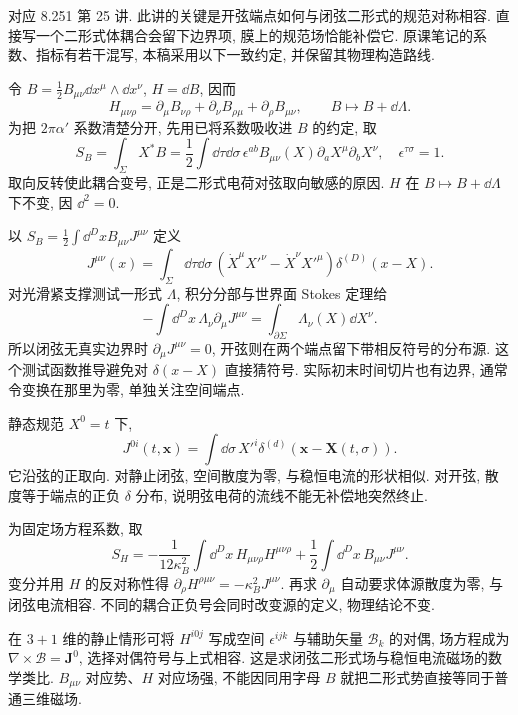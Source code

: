 \label{ch:basic-twoform}
对应 8.251 第 25 讲. 此讲的关键是开弦端点如何与闭弦二形式的规范对称相容. 直接写一个二形式体耦合会留下边界项, 膜上的规范场恰能补偿它. 原课笔记的系数、指标有若干混写, 本稿采用以下一致约定, 并保留其物理构造路线.

令 $B=\frac12B_{\mu\nu}\dd x^\mu\wedge\dd x^\nu$, $H=\dd B$, 因而
\[
 H_{\mu\nu\rho}=\partial_\mu B_{\nu\rho}
 +\partial_\nu B_{\rho\mu}+\partial_\rho B_{\mu\nu},
 \qquad B\mapsto B+\dd\Lambda.
\]
为把 $2\pi\alpha'$ 系数清楚分开, 先用已将系数吸收进 $B$ 的约定, 取
\[
 S_B=\int_\Sigma X^*B
 =\frac12\int\dd\tau\dd\sigma\,
 \epsilon^{ab}B_{\mu\nu}(X)\partial_aX^\mu\partial_bX^\nu,
 \quad\epsilon^{\tau\sigma}=1.
\]
取向反转使此耦合变号, 正是二形式电荷对弦取向敏感的原因. $H$ 在 $B\mapsto B+\dd\Lambda$ 下不变, 因 $\dd^2=0$.

以 $S_B=\frac12\int\dd^Dx B_{\mu\nu}J^{\mu\nu}$ 定义
\[
 J^{\mu\nu}(x)=\int_\Sigma\dd\tau\dd\sigma\,
 (\dot X^\mu X'^\nu-\dot X^\nu X'^\mu)
 \delta^{(D)}(x-X).
\]
对光滑紧支撑测试一形式 $\Lambda$, 积分分部与世界面 Stokes 定理给
\[
 -\int\dd^Dx\,\Lambda_\nu\partial_\mu J^{\mu\nu}
 =\int_{\partial\Sigma}\Lambda_\nu(X)\dd X^\nu.
\]
所以闭弦无真实边界时 $\partial_\mu J^{\mu\nu}=0$, 开弦则在两个端点留下带相反符号的分布源. 这个测试函数推导避免对 $\delta(x-X)$ 直接猜符号. 实际初末时间切片也有边界, 通常令变换在那里为零, 单独关注空间端点.

静态规范 $X^0=t$ 下,
\[
 J^{0i}(t,\boldsymbol x)=\int\dd\sigma\,
 X'^i\delta^{(d)}(\boldsymbol x-\boldsymbol X(t,\sigma)).
\]
它沿弦的正取向. 对静止闭弦, 空间散度为零, 与稳恒电流的形状相似. 对开弦, 散度等于端点的正负 $\delta$ 分布, 说明弦电荷的流线不能无补偿地突然终止.

为固定场方程系数, 取
\[
 S_H=-\frac1{12\kappa_B^2}\int\dd^Dx\,H_{\mu\nu\rho}H^{\mu\nu\rho}
 +\frac12\int\dd^Dx\,B_{\mu\nu}J^{\mu\nu}.
\]
变分并用 $H$ 的反对称性得 $\partial_\rho H^{\rho\mu\nu}=-\kappa_B^2J^{\mu\nu}$. 再求 $\partial_\mu$ 自动要求体源散度为零, 与闭弦电流相容. 不同的耦合正负号会同时改变源的定义, 物理结论不变.

在 $3+1$ 维的静止情形可将 $H^{i0j}$ 写成空间 $\epsilon^{ijk}$ 与辅助矢量 $\mathcal B_k$ 的对偶, 场方程成为 $\nabla\times\boldsymbol{\mathcal B}=\boldsymbol J^0$, 选择对偶符号与上式相容. 这是求闭弦二形式场与稳恒电流磁场的数学类比. $B_{\mu\nu}$ 对应势、$H$ 对应场强, 不能因同用字母 $B$ 就把二形式势直接等同于普通三维磁场.

